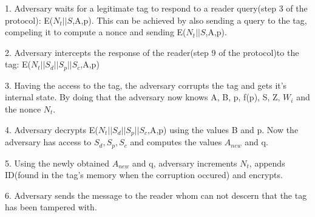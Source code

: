     1. Adversary waits for a legitimate tag to respond to a reader query(step 3 of the protocol): E($N_t||S$,A,p).
    This can be achieved by also sending a query to the tag, compeling it to compute a nonce and sending E($N_t||S$,A,p).
    
    2. Adversary intercepts the response of the reader(step 9 of the protocol)to the tag: E($N_t||S_d||S_p||S_c$,A,p)
    
    3. Having the access to the tag, the adversary corrupts the tag and gets it's internal state. By doing that the adversary now knows A, B, p, f(p), S, Z, $W_i$ and the nonce $N_t$.
    
    4. Adversary decrypts E($N_t||S_d||S_p||S_c$,A,p) using the values B and p. Now the adversary has access to $S_d, S_p, S_c$ and computes the values $A_{new}$ and q.
    
    5. Using the newly obtained $A_{new}$ and q, adversary increments $N_t$, appends ID(found in the tag's memory when the corruption occured) and encrypts.
    
    6. Adversary sends the message to the reader whom can not descern that the tag has been tampered with.


